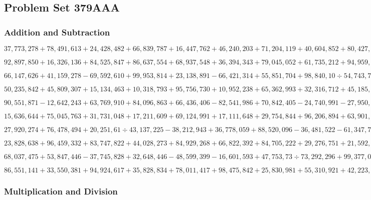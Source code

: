 \hypertarget{problem-set-379aaa}{%
\subsection{Problem Set 379AAA}\label{problem-set-379aaa}}

\hypertarget{addition-and-subtraction}{%
\subsubsection{Addition and
Subtraction}\label{addition-and-subtraction}}

\(37,773,278+78,491,613+24,428,482+66,839,787+16,447,762+46,240,203+71,204,119+40,604,852+80,427,271+73,465,881\)

\(92,897,850+16,326,136+84,525,847+86,637,554+68,937,548+36,394,343+79,045,052+61,735,212+94,959,368+81,175,836\)

\(66,147,626+41,159,278-69,592,610+99,953,814+23,138,891-66,421,314+55,851,704+98,840,10÷54,743,747-51,110,481\)

\(50,235,842+45,809,307+15,134,463+10,318,793+95,756,730+10,952,238+65,362,993+32,316,712+45,185,609+52,033,481\)

\(90,551,871-12,642,243+63,769,910+84,096,863+66,436,406-82,541,986+70,842,405-24,740,991-27,950,180+22,783,462\)

\(15,636,644+75,045,763+31,731,048+17,211,609+69,124,991+17,111,648+29,754,844+96,206,894+63,901,728+10,407,551\)

\(27,920,274+76,478,494+20,251,61÷43,137,225-38,212,943+36,778,059+88,520,096-36,481,522-61,347,734+63,500,396\)

\(23,828,638+96,459,332+83,747,822+44,028,273+84,929,268+66,822,392+84,705,222+29,276,751+21,592,727+56,182,628\)

\(68,037,475+53,847,446-37,745,828+32,648,446-48,599,399-16,601,593+47,753,73÷73,292,296+99,377,084+17,078,992\)

\(86,551,141+33,550,381+94,924,617+35,828,834+78,011,417+98,475,842+25,830,981+55,310,921+42,223,520+72,061,986\)

\hypertarget{multiplication-and-division}{%
\subsubsection{Multiplication and
Division}\label{multiplication-and-division}}

